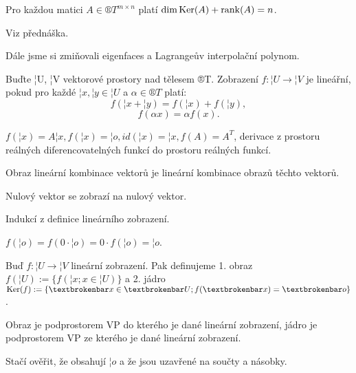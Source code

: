 \documentclass[12pt]{article}					%
\begin{document}
    \begin{veta}
        Pro každou matici $A\in ®T^{m \times n}$ platí $\dim\operatorname{Ker}(A) + \operatorname{rank}(A) = n$.
        \begin{dukazin}
            Viz přednáška.
        \end{dukazin}
    \end{veta}

    \begin{poznamka}
        Dále jsme si zmiňovali eigenfaces a Lagrangeův interpolační polynom.
    \end{poznamka}


    \begin{definice}
        Buďte ¦U, ¦V vektorové prostory nad tělesem ®T. Zobrazení $f: ¦U \rightarrow ¦V$ je lineářní, pokud pro každé $¦x, ¦y \in ¦U$ a $\alpha \in ®T$ platí:
        $$ f(¦x+¦y) = f(¦x) + f(¦y), $$ 
        $$ f(\alpha x) = \alpha f(x). $$ 
    \end{definice}
    
    \begin{priklady}
        $f(¦x) = A¦x, f(¦x) = ¦o, id(¦x) = ¦x, f(A) = A^T$, derivace z prostoru reálných diferencovatelných funkcí do prostoru reálných funkcí.
    \end{priklady}

    \begin{tvrzeni}
        Obraz lineární kombinace vektorů je lineární kombinace obrazů těchto vektorů.

        Nulový vektor se zobrazí na nulový vektor.
        \begin{dukazin}
            Indukcí z definice lineárního zobrazení.

            $f(¦o) = f(0·¦o) = 0·f(¦o) = ¦o$.
        \end{dukazin}
    \end{tvrzeni}

    \begin{definice}
        Buď $f: ¦U \rightarrow ¦V$ lineární zobrazení. Pak definujeme 1. obraz $f(¦U) := \{f(¦x; x \in ¦U)\}$ a 2. jádro $\Ker(f) := \{¦x \in ¦U; f(¦x) = ¦o\}$.
    \end{definice}

    \begin{tvrzeni}
        Obraz je podprostorem VP do kterého je dané lineární zobrazení, jádro je podprostorem VP ze kterého je dané lineární zobrazení.

        \begin{dukazin}
            Stačí ověřit, že obsahují $¦o$ a že jsou uzavřené na součty a násobky.
        \end{dukazin}
    \end{tvrzeni}
\end{document}

